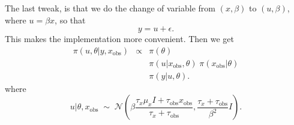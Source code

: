\documentclass[a4paper,11pt]{article}
\def\o{_{\text{obs}}}
\begin{document}
The last tweak, is that we do the change of variable from $(x, \beta)$
to $(u, \beta)$, where $u = \beta x$, so that
\begin{displaymath}
    y = u + \epsilon.
\end{displaymath}
This makes the implementation more convenient.
Then we get
\begin{eqnarray}\label{eq1}%
    \pi(u, \theta | y, x\o) &\propto& \pi(\theta)\\
    && \pi(u | x\o, \theta) \; \pi(x\o | \theta) \\
    && \pi(y | u, \theta).
\end{eqnarray}
where
\begin{displaymath}
    u | \theta, x\o \;\sim\;{\mathcal N}\left(
      \beta\frac{\tau_{x} \mu_{x} I + \tau\o x\o}{
          \tau_{x}+\tau\o}, 
      \frac{{\tau_{x} + \tau\o}}{\beta^{2}} I \right).
\end{displaymath}
\end{document}
